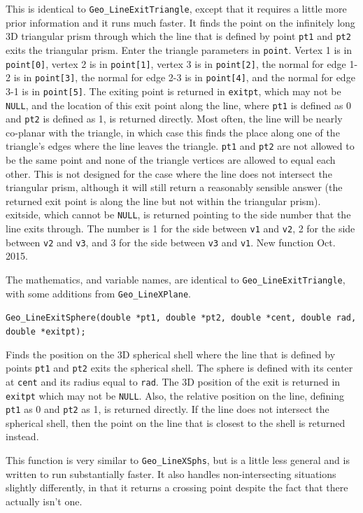 \documentclass[11pt]{article}
\newcommand {\ttt} {\texttt}
\begin{document}
\begin{description}
This is identical to \ttt{Geo\_LineExitTriangle}, except that it requires a little more prior information and it runs much faster. It finds the point on the infinitely long 3D triangular prism through which the line that is defined by point \ttt{pt1} and \ttt{pt2} exits the triangular prism. Enter the triangle parameters in \ttt{point}. Vertex 1 is in \ttt{point[0]}, vertex 2 is in \ttt{point[1]}, vertex 3 is in \ttt{point[2]}, the normal for edge 1-2 is in \ttt{point[3]}, the normal for edge 2-3 is in \ttt{point[4]}, and the normal for edge 3-1 is in \ttt{point[5]}. The exiting point is returned in \ttt{exitpt}, which may not be \ttt{NULL}, and the location of this exit point along the line, where \ttt{pt1} is defined as 0 and \ttt{pt2} is defined as 1, is returned directly. Most often, the line will be nearly co-planar with the triangle, in which case this finds the place along one of the triangle's edges where the line leaves the triangle. \ttt{pt1} and \ttt{pt2} are not allowed to be the same point and none of the triangle vertices are allowed to equal each other. This is not designed for the case where the line does not intersect the triangular prism, although it will still return a reasonably sensible answer (the returned exit point is along the line but not within the triangular prism). exitside, which cannot be \ttt{NULL}, is returned pointing to the side number that the line exits through. The number is 1 for the side between \ttt{v1} and \ttt{v2}, 2 for the side between \ttt{v2} and \ttt{v3}, and 3 for the side between \ttt{v3} and \ttt{v1}. New function Oct. 2015.

The mathematics, and variable names, are identical to \ttt{Geo\_LineExitTriangle}, with some additions from \ttt{Geo\_LineXPlane}.

\item[\ttt{double}]
\ttt{Geo\_LineExitSphere(double *pt1, double *pt2, double *cent, double rad, double *exitpt);}

Finds the position on the 3D spherical shell where the line that is defined by points \ttt{pt1} and \ttt{pt2} exits the spherical shell. The sphere is defined with its center at \ttt{cent} and its radius equal to \ttt{rad}. The 3D position of the exit is returned in \ttt{exitpt} which may not be \ttt{NULL}. Also, the relative position on the line, defining \ttt{pt1} as 0 and \ttt{pt2} as 1, is returned directly. If the line does not intersect the spherical shell, then the point on the line that is closest to the shell is returned instead.

This function is very similar to \ttt{Geo\_LineXSphs}, but is a little less general and is written to run substantially faster. It also handles non-intersecting situations slightly differently, in that it returns a crossing point despite the fact that there actually isn't one.


\end{description}
\end{document}
